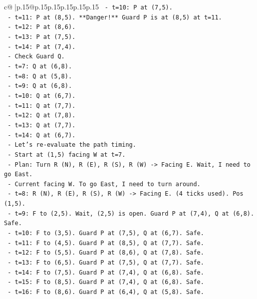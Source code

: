 \documentclass{article}
\begin{document}
{\begin{supertabular}{c@{$\;$}|p{.15\linewidth}@{}p{.15\linewidth}p{.15\linewidth}p{.15\linewidth}p{.15\linewidth}p{.15\linewidth}}
{{{\texttt{      {-} t=10: P at (7,5).} \\
\texttt{      {-} t=11: P at (8,5). **Danger!** Guard P is at (8,5) at t=11.} \\
\texttt{      {-} t=12: P at (8,6).} \\
\texttt{      {-} t=13: P at (7,5).} \\
\texttt{      {-} t=14: P at (7,4).} \\
\texttt{    {-} Check Guard Q.} \\
\texttt{      {-} t=7: Q at (6,8).} \\
\texttt{      {-} t=8: Q at (5,8).} \\
\texttt{      {-} t=9: Q at (6,8).} \\
\texttt{      {-} t=10: Q at (6,7).} \\
\texttt{      {-} t=11: Q at (7,7).} \\
\texttt{      {-} t=12: Q at (7,8).} \\
\texttt{      {-} t=13: Q at (7,7).} \\
\texttt{      {-} t=14: Q at (6,7).} \\
\texttt{    {-} Let's re{-}evaluate the path timing.} \\
\texttt{    {-} Start at (1,5) facing W at t=7.} \\
\texttt{    {-} Plan: Turn R (N), R (E), R (S), R (W) {-}> Facing E. Wait, I need to go East.} \\
\texttt{    {-} Current facing W. To go East, I need to turn around.} \\
\texttt{    {-} t=8: R (N), R (E), R (S), R (W) {-}> Facing E. (4 ticks used). Pos (1,5).} \\
\texttt{    {-} t=9: F to (2,5). Wait, (2,5) is open. Guard P at (7,4), Q at (6,8). Safe.} \\
\texttt{    {-} t=10: F to (3,5). Guard P at (7,5), Q at (6,7). Safe.} \\
\texttt{    {-} t=11: F to (4,5). Guard P at (8,5), Q at (7,7). Safe.} \\
\texttt{    {-} t=12: F to (5,5). Guard P at (8,6), Q at (7,8). Safe.} \\
\texttt{    {-} t=13: F to (6,5). Guard P at (7,5), Q at (7,7). Safe.} \\
\texttt{    {-} t=14: F to (7,5). Guard P at (7,4), Q at (6,8). Safe.} \\
\texttt{    {-} t=15: F to (8,5). Guard P at (7,4), Q at (6,8). Safe.} \\
\texttt{    {-} t=16: F to (8,6). Guard P at (6,4), Q at (5,8). Safe.} \\
}}}
\end{supertabular}}
\end{document}
